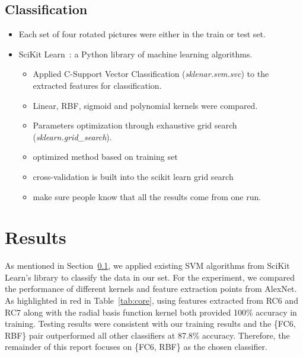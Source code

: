 \documentclass{article} %
\begin{document}
\subsection{Classification}
\label{sec:classification}
 \begin{itemize}
  \item Each set of four rotated pictures were either in the train or test set. 
  \item SciKit Learn~\citep{scikit-learn}: a Python library of machine learning algorithms. 
 \begin{itemize}
 \item Applied C-Support Vector Classification (\emph{sklenar.svm.svc}) to the extracted features for classification. 
 \item Linear, RBF, sigmoid and polynomial kernels were compared. 
 \item Parameters optimization through exhaustive grid search (\emph{sklearn.grid\_search}).
 \item optimized method based on training set
 \item cross-validation is built into the scikit learn grid search
 \item make sure people know that all the results come from one run. 
 \end{itemize}
 \end{itemize}
 
 \section{Results}
 \label{sec:results}
As mentioned in Section~\ref{sec:classification}, we applied existing SVM algorithms from SciKit Learn's library to classify the data in our set. For the experiment, we compared the performance of different kernels and feature extraction points from AlexNet. As highlighted in red in Table~\ref{tab:core}, using features extracted from RC6 and RC7 along with the radial basis function kernel both 
provided 100\% accuracy in training. Testing results were consistent with our training results and the \{FC6, RBF\} pair outperformed all other classifiers at 87.8\% accuracy. Therefore, the remainder of this report focuses on \{FC6, RBF\} as the chosen classifier. 
\end{document}
